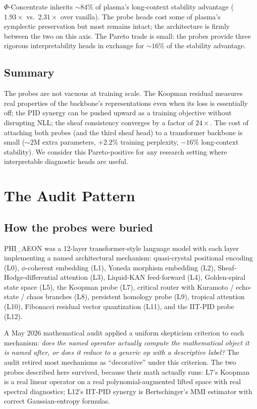 \documentclass[11pt]{article}
\begin{document}
$\Phi$-Concentrate inherits $\sim 84\%$ of plasma's long-context
stability advantage ($1.93\times$ vs.\ $2.31\times$ over vanilla). The
probe heads cost some of plasma's symplectic preservation but most
remains intact; the architecture is firmly between the two on this
axis. The Pareto trade is small: the probes provide three rigorous
interpretability heads in exchange for $\sim 16\%$ of the stability
advantage.

\subsection{Summary}

The probes are not vacuous at training scale. The Koopman residual
measures real properties of the backbone's representations even when its
loss is essentially off; the PID synergy can be pushed upward as a
training objective without disrupting NLL; the sheaf consistency
converges by a factor of $24\times$. The cost of attaching both probes
(and the third sheaf head) to a transformer backbone is small
($\sim 2$M extra parameters, $+2.2\%$ training perplexity, $-16\%$
long-context stability). We consider this Pareto-positive for any
research setting where interpretable diagnostic heads are useful.

\section{The Audit Pattern}

\subsection{How the probes were buried}

PHI\_AEON was a 12-layer transformer-style language model with each layer
implementing a named architectural mechanism: quasi-crystal positional
encoding (L0), $\phi$-coherent embedding (L1), Yoneda morphism embedding
(L2), Sheaf-Hodge-differential attention (L3), Liquid-KAN feed-forward
(L4), Golden-spiral state space (L5), the Koopman probe (L7), critical
router with Kuramoto / echo-state / chaos branches (L8), persistent
homology probe (L9), tropical attention (L10), Fibonacci residual vector
quantization (L11), and the IIT-PID probe (L12).

A May 2026 mathematical audit applied a uniform skepticism criterion to
each mechanism: \emph{does the named operator actually compute the
mathematical object it is named after, or does it reduce to a generic op
with a descriptive label?} The audit retired most mechanisms as
``decorative'' under this criterion. The two probes described here
survived, because their math actually runs: L7's Koopman is a real linear
operator on a real polynomial-augmented lifted space with real spectral
diagnostics; L12's IIT-PID synergy is Bertschinger's MMI estimator with
correct Gaussian-entropy formulas.
\end{document}
